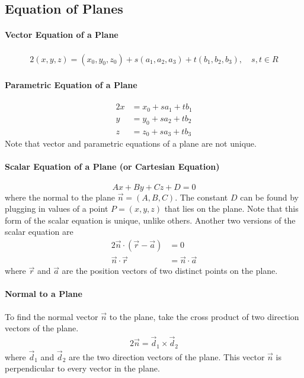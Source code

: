 \documentclass{report}
\theoremstyle{definition}
\numberwithin{equation}{section}
\begin{document}
\subsection{Equation of Planes}
\paragraph{Vector Equation of a Plane}
\begin{alignat}{2}{}
	(x,y,z) = (x_0,y_0,z_0) + s(a_1,a_2,a_3) + t(b_1,b_2,b_3), \quad s,t \in R
\end{alignat}

\paragraph{Parametric Equation of a Plane}
\begin{alignat}{2}{}
	x &= x_0 + sa_1 + tb_1 \\
	y &= y_0 + sa_2 + tb_2 \\
	z &= z_0 + sa_3 + tb_3
\end{alignat}
Note that vector and parametric equations of a plane are not unique.

\paragraph{Scalar Equation of a Plane (or Cartesian Equation)}
\begin{equation}
	Ax+By+Cz+D=0
\end{equation}
where the normal to the plane $\vec n = (A,B,C)$. The constant $D$ can be found by plugging in values of a point $P=(x,y,z)$ that lies on the plane. Note that this form of the scalar equation is unique, unlike others. Another two versions of the scalar equation are
\begin{alignat}{2}{}
	\vec n \cdot (\vec r - \vec a) &= 0 \\
	\vec n \cdot \vec r &= \vec n \cdot \vec a
\end{alignat}
where $\vec r$ and $\vec a$ are the position vectors of two distinct points on the plane.

\paragraph{Normal to a Plane}
To find the normal vector $\vec n$ to the plane, take the cross product of two direction vectors of the plane.
\begin{alignat}{2}{}
	\vec n = \vec d_1 \times \vec d_2
\end{alignat}
where $\vec d_1$ and $\vec d_2$ are the two direction vectors of the plane. This vector $\vec n$ is perpendicular to every vector in the plane.
\end{document}
